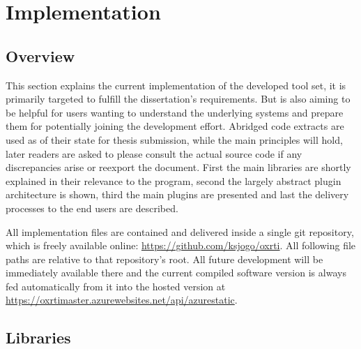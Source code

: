 \section{Implementation}

\subsection{Overview}
This section explains the current implementation of the developed tool set, it
is primarily targeted to fulfill the dissertation's requirements. But is also
aiming to be helpful for users wanting to understand the underlying systems and
prepare them for potentially joining the development effort. Abridged code
extracts are used as of their state for thesis submission, while the main
principles will hold, later readers are asked to please consult the actual
source code if any discrepancies arise or reexport the document. First the main libraries are shortly
explained in their relevance to the program, second the largely abstract plugin
architecture is shown, third the main plugins are presented and last the
delivery processes to the end users are described.


All implementation files are contained and delivered inside a single git
repository, which is freely available online:
\url{https://github.com/ksjogo/oxrti}. All following file paths are relative to that repository's root. All future development will
be immediately available there and the current compiled software version is
always fed automatically from it into the hosted version at \url{https://oxrtimaster.azurewebsites.net/api/azurestatic}.

\subsection{Libraries}
